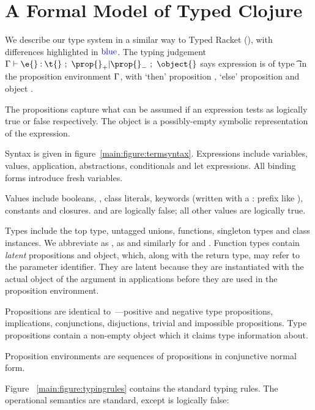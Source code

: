 \section{A Formal Model of Typed Clojure}

\label{sec:formal}

We describe our type system in a similar way to Typed Racket (\citet{TF10}),
with differences highlighted in $\mathbin{\textcolor{blue}{\text{blue}}}$.
The typing judgement 
$
{\judgement   {\propenv}
              {\hastype {\e{}} {\t{}}}
  {\filterset {\thenprop {\prop{}}}
              {\elseprop {\prop{}}}}
  {\object{}}}
$
says expression \e{} is of type \t{} in the 
proposition environment $\Gamma{}$, with 
`then' proposition {\thenprop {\prop{}}}, `else' proposition {\elseprop {\prop{}}}
and object \object{}.

The propositions capture what can be assumed if an expression tests as logically true or false
respectively. The object is a possibly-empty symbolic representation of the expression.

Syntax is given in figure~\ref{main:figure:termsyntax}. Expressions include variables, values,
application, abstractions, conditionals and let expressions.
All binding forms introduce fresh variables.

Values include booleans, \nil{}, class literals, keywords (written with a : prefix like ), 
constants and closures.  \false{} and \nil{} are logically false; all other values are logically true.

Types include the top type, untagged unions, functions, singleton types
and class instances. We abbreviate \EmptyUnion{} as \Bot{}, {\ValueNil} as \Nil{} and similarly
for \True and \False.
Function types contain \emph{latent} propositions and object, which, along with the return type,
may refer to the parameter identifier. They are latent because they are instantiated with the
actual object of the argument in applications before they are used in the proposition environment.

Propositions are identical to~\cite{TF10}---positive and negative type propositions, implications,
conjunctions, disjuctions, trivial and impossible propositions.
Type propositions contain a non-empty object which it claims type information about.

Proposition environments are sequences of propositions in conjunctive normal form.

Figure ~\ref{main:figure:typingrules} contains the standard typing rules.
The operational semantics are standard, except \nil{} is logically false:

